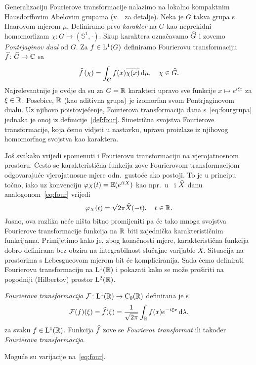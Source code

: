 \documentclass[main.tex]{subfiles}
\begin{document}
Generalizaciju Fourierove transformacije nalazimo na lokalno kompaktnim Hausdorffovim Abelovim grupama (v.~\cite[,5.2]{gogic} za detalje).
Neka je \( G \) takva grupa s Haarovom mjerom \( \mu \).
Definiramo prvo \emph{karakter} na \( G \) kao neprekidni homomorfizam \( \chi \colon G \to \left( \mathbb S^1, \cdot \right) \).
Skup karaktera označavamo \( \widehat{G} \) i zovemo \emph{Pontrjaginov dual} od \( G \). Za
\( f \in \mathrm{L}^1(G) \) definiramo Fourierovu transformaciju \( \widehat{f} \colon \widehat{G} \to \mathbb{C} \) sa
\begin{equation}\label{eq:fourgrupa}
	\widehat{f} \left( \chi \right) =
	\int_G f(x) \overline{\chi(x)} \,\mathrm d \mu, \quad \chi \in \widehat{G}.
\end{equation}
Najrelevantnije je ovdje da su za \( G = \mathbb{R} \) karakteri upravo sve
funkcije \( x \mapsto e^{i\xi x} \) za \( \xi \in \mathbb{R} \).
Posebice, \( \mathbb{R} \) (kao aditivna grupa) je izomorfan
svom Pontrjaginovom dualu. Uz njihovo poistovjećenje,
Fourierova transformacija dana s~\eqref{eq:fourgrupa}
jednaka je onoj iz definicije~\ref{def:four}.
Simetrična svojstva Fourierove transformacije, koja ćemo vidjeti u nastavku, upravo
proizlaze iz njihovog homomorfnog svojstva kao karaktera.

Još svakako vrijedi spomenuti i Fourierovu transformaciju na vjerojatnosnom prostoru.
Često se karakteristična funkcija zove Fourierovom transformacijom odgovarajuće
vjerojatnosne mjere odn.\ gustoće ako postoji.
To je u principu točno, iako uz konvenciju
\( \varphi_X(t)=\mathbb{E}(e^{itX}) \) kao npr.\ u~\cite[]{sarapa}
i \( \widehat{X} \) danu analogonom~\eqref{eq:four} vrijedi
\begin{equation}
	\varphi_X(t) = \sqrt{2\pi}\widehat{X}(-t), \quad t \in \mathbb{R}.
\end{equation}
Jasno, ova razlika neće ništa bitno promijeniti pa će tako
mnoga svojstva Fourierove trans\-formacije funkcija na \( \mathbb{R} \)
biti zajednička karakterističnim funkcijama. Primijetimo
kako je, zbog konačnosti mjere, karakteristična funkcija
dobro definirana bez obzira na integrabilnost slučajne
varijable \( X \). Situacija na prostorima s Lebesgueovom mjerom
bit će kompliciranija. Sada ćemo definirati
Fourierovu transformaciju na \( \mathrm{L}^1(\mathbb{R}) \) i pokazati
kako se može proširiti na pogodniji (Hilbertov)
prostor \( \mathrm{L}^2(\mathbb{R}) \).

\begin{definicija}\label{def:four}
	\emph{Fourierova transformacija} \( \mathcal F \colon \mathrm{L}^1(\mathbb{R}) \to \mathrm C_0(\mathbb{R}) \)
	definirana je s
	\begin{equation}\label{eq:four}
		\mathcal F(f)(\xi) = \widehat{f}(\xi) =
		\frac 1{\sqrt{2\pi}} \int_{\mathbb{R}} f(x)e^{-i\xi x} \,\mathrm d \lambda.
	\end{equation}
	za svaku \( f \in \mathrm{L}^1(\mathbb{R}) \). Funkcija \( \widehat{f} \)
	zove se \emph{Fourierov transformat} ili također \emph{Fourierova trans\-for\-ma\-ci\-ja}.
\end{definicija}

\begin{komentar}\label{kom:four1}
	Moguće su varijacije na~\eqref{eq:four}.

\end{komentar}

\begin{komentar}\label{kom:four2}
\end{komentar}
\end{document}
